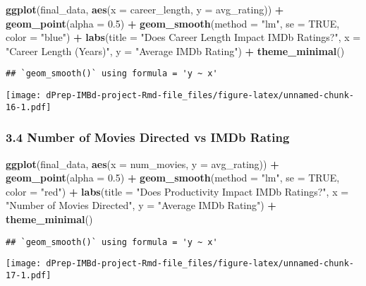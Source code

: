 \documentclass[
]{article}
\newenvironment{Shaded}{\begin{snugshade}}{\end{snugshade}}
\newcommand{\AttributeTok}[1]{\textcolor[rgb]{0.13,0.29,0.53}{#1}}
\newcommand{\ConstantTok}[1]{\textcolor[rgb]{0.56,0.35,0.01}{#1}}
\newcommand{\FloatTok}[1]{\textcolor[rgb]{0.00,0.00,0.81}{#1}}
\newcommand{\FunctionTok}[1]{\textcolor[rgb]{0.13,0.29,0.53}{\textbf{#1}}}
\newcommand{\NormalTok}[1]{#1}
\newcommand{\SpecialCharTok}[1]{\textcolor[rgb]{0.81,0.36,0.00}{\textbf{#1}}}
\newcommand{\StringTok}[1]{\textcolor[rgb]{0.31,0.60,0.02}{#1}}
\begin{document}
\begin{Shaded}
\begin{Highlighting}[]
\FunctionTok{ggplot}\NormalTok{(final\_data, }\FunctionTok{aes}\NormalTok{(}\AttributeTok{x =}\NormalTok{ career\_length, }\AttributeTok{y =}\NormalTok{ avg\_rating)) }\SpecialCharTok{+}
  \FunctionTok{geom\_point}\NormalTok{(}\AttributeTok{alpha =} \FloatTok{0.5}\NormalTok{) }\SpecialCharTok{+}
  \FunctionTok{geom\_smooth}\NormalTok{(}\AttributeTok{method =} \StringTok{"lm"}\NormalTok{, }\AttributeTok{se =} \ConstantTok{TRUE}\NormalTok{, }\AttributeTok{color =} \StringTok{"blue"}\NormalTok{) }\SpecialCharTok{+}
  \FunctionTok{labs}\NormalTok{(}\AttributeTok{title =} \StringTok{"Does Career Length Impact IMDb Ratings?"}\NormalTok{,}
       \AttributeTok{x =} \StringTok{"Career Length (Years)"}\NormalTok{,}
       \AttributeTok{y =} \StringTok{"Average IMDb Rating"}\NormalTok{) }\SpecialCharTok{+}
  \FunctionTok{theme\_minimal}\NormalTok{()}
\end{Highlighting}
\end{Shaded}

\begin{verbatim}
## `geom_smooth()` using formula = 'y ~ x'
\end{verbatim}

\texttt{[image: dPrep-IMBd-project-Rmd-file\_files/figure-latex/unnamed-chunk-16-1.pdf]}

\subsubsection{3.4 Number of Movies Directed vs IMDb
Rating}\label{number-of-movies-directed-vs-imdb-rating}

\begin{Shaded}
\begin{Highlighting}[]
\FunctionTok{ggplot}\NormalTok{(final\_data, }\FunctionTok{aes}\NormalTok{(}\AttributeTok{x =}\NormalTok{ num\_movies, }\AttributeTok{y =}\NormalTok{ avg\_rating)) }\SpecialCharTok{+}
  \FunctionTok{geom\_point}\NormalTok{(}\AttributeTok{alpha =} \FloatTok{0.5}\NormalTok{) }\SpecialCharTok{+}
  \FunctionTok{geom\_smooth}\NormalTok{(}\AttributeTok{method =} \StringTok{"lm"}\NormalTok{, }\AttributeTok{se =} \ConstantTok{TRUE}\NormalTok{, }\AttributeTok{color =} \StringTok{"red"}\NormalTok{) }\SpecialCharTok{+}
  \FunctionTok{labs}\NormalTok{(}\AttributeTok{title =} \StringTok{"Does Productivity Impact IMDb Ratings?"}\NormalTok{,}
       \AttributeTok{x =} \StringTok{"Number of Movies Directed"}\NormalTok{,}
       \AttributeTok{y =} \StringTok{"Average IMDb Rating"}\NormalTok{) }\SpecialCharTok{+}
  \FunctionTok{theme\_minimal}\NormalTok{()}
\end{Highlighting}
\end{Shaded}

\begin{verbatim}
## `geom_smooth()` using formula = 'y ~ x'
\end{verbatim}

\texttt{[image: dPrep-IMBd-project-Rmd-file\_files/figure-latex/unnamed-chunk-17-1.pdf]}
\end{document}
